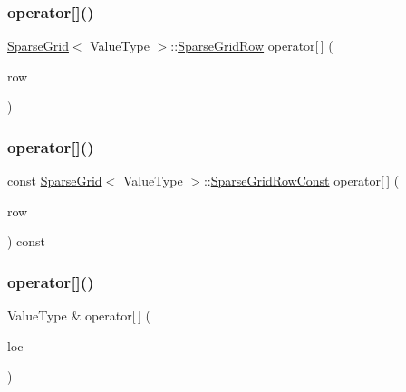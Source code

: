 \mbox{\label{classSparseGrid_aa9fc713bc20f40c89e4b3a86a4583fb9}} 
\subsubsection{\texorpdfstring{operator[]()}{operator[]()}\hspace{0.1cm}{\footnotesize\ttfamily [1/4]}}
{\footnotesize\ttfamily \mbox{\hyperlink{classSparseGrid}{Sparse\+Grid}}$<$ Value\+Type $>$\+::\mbox{\hyperlink{classSparseGrid_1_1SparseGridRow}{Sparse\+Grid\+Row}} operator\mbox{[}$\,$\mbox{]} (\begin{DoxyParamCaption}\item[{int}]{row }\end{DoxyParamCaption})}

\mbox{\label{classSparseGrid_a269741238689cf035ad12e8cff38844f}} 
\subsubsection{\texorpdfstring{operator[]()}{operator[]()}\hspace{0.1cm}{\footnotesize\ttfamily [2/4]}}
{\footnotesize\ttfamily const \mbox{\hyperlink{classSparseGrid}{Sparse\+Grid}}$<$ Value\+Type $>$\+::\mbox{\hyperlink{classSparseGrid_1_1SparseGridRowConst}{Sparse\+Grid\+Row\+Const}} operator\mbox{[}$\,$\mbox{]} (\begin{DoxyParamCaption}\item[{int}]{row }\end{DoxyParamCaption}) const}

\mbox{\label{classSparseGrid_afcc1243cd81603e13b8f223f0ceabe96}} 
\subsubsection{\texorpdfstring{operator[]()}{operator[]()}\hspace{0.1cm}{\footnotesize\ttfamily [3/4]}}
{\footnotesize\ttfamily Value\+Type \& operator\mbox{[}$\,$\mbox{]} (\begin{DoxyParamCaption}\item[{const \mbox{\hyperlink{structGridLocation}{Grid\+Location}} \&}]{loc }\end{DoxyParamCaption})}

